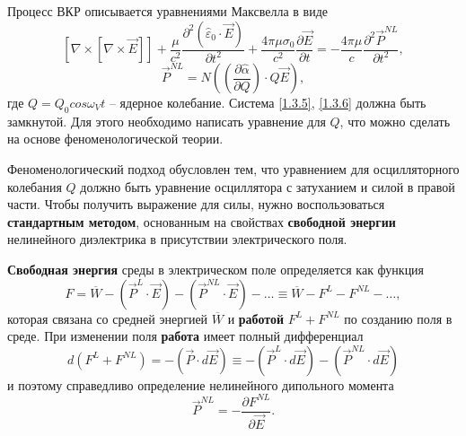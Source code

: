 \documentclass[a4paper]{article}
\begin{document}
Процесс ВКР описывается уравнениями Максвелла в виде
\begin{equation}
	\left[\nabla\times\left[\nabla\times\vec{E}\right]\right]+\frac{\mu}{c^{2}}\frac{\partial^{2}\left(\hat{\varepsilon}_{0}\cdot\vec{E}\right)}{\partial t^{2}}+\frac{4\pi\mu\sigma_{0}}{c^{2}}\frac{\partial\vec{E}}{\partial t}=-\frac{4\pi\mu}{c}\frac{\partial^{2}\vec{P}^{NL}}{\partial t^{2}},
	\label{1.3.5}
\end{equation}
\begin{equation}
	\vec{P}^{NL}=N\left(\left(\frac{\partial\hat{\alpha}}{\partial Q}\right)\cdot Q\vec{E}\right),
	\label{1.3.6}
\end{equation}
где $Q=Q_{0}cos\omega_{V}t$ -- ядерное колебание. Система \eqref{1.3.5}, \eqref{1.3.6} должна быть замкнутой. Для этого необходимо написать уравнение для $Q$, что можно сделать на основе феноменологической теории. 

Феноменологический подход обусловлен тем, что уравнением для осцилляторного колебания $Q$ должно быть уравнение осциллятора с затуханием и силой в правой части. Чтобы получить выражение для силы, нужно воспользоваться \textbf{стандартным методом}, основанным на свойствах \textbf{свободной энергии} нелинейного диэлектрика в присутствии электрического поля. 

\textbf{Свободная энергия} среды в электрическом поле определяется  как функция
\begin{equation}
	F=\overline{W}-\left(\vec{P}^{L}\cdot\vec{E}\right)-\left(\vec{P}^{NL}\cdot\vec{E}\right)-\dots\equiv\overline{W}-F^{L}-F^{NL}-\dots,\tag{7'}
	\label{1.3.7'}
\end{equation}
которая связана со средней энергией $\overline{W}$ и \textbf{работой} $F^{L}+F^{NL}$ по созданию поля в среде. При изменении поля \textbf{работа}  имеет полный дифференциал 
\begin{equation}
	d(F^{L}+F^{NL})=-\left(\vec{P}\cdot d\vec{E}\right)\equiv-\left(\vec{P}^{L}\cdot d\vec{E}\right)-\left(\vec{P}^{NL}\cdot d\vec{E}\right)
	\label{1.3.7}
\end{equation}
и поэтому справедливо определение нелинейного дипольного момента
\begin{equation}
	\vec{P}^{NL}=-\frac{\partial F^{NL}}{\partial \vec{E}}.
	\tag{6*}
	\label{1.3.6*}
\end{equation}
\end{document}

